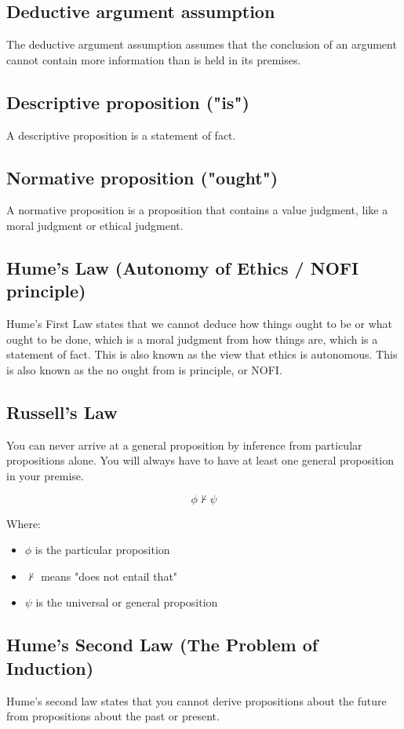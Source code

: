 \documentclass[11pt]{article}
\begin{document}
\subsection{Deductive argument assumption}
\label{sec:org63f4951}
The deductive argument assumption assumes that the conclusion of an argument cannot contain more information than is held in its premises.
\subsection{Descriptive proposition ("is")}
\label{sec:orge9955ba}
A descriptive proposition is a statement of fact.
\subsection{Normative proposition ("ought")}
\label{sec:org2c5ef66}
A normative proposition is a proposition that contains a value judgment, like a moral judgment or ethical judgment.
\subsection{Hume's Law (Autonomy of Ethics / NOFI principle)}
\label{sec:org2967670}
Hume's First Law states that we cannot deduce how things ought to be or what ought to be done, which is a moral judgment from how things are, which is a statement of fact. This is also known as the view that ethics is autonomous. This is also known as the no ought from is principle, or NOFI.
\subsection{Russell's Law}
\label{sec:org8ccf185}
You can never arrive at a general proposition by inference from particular propositions alone. You will always have to have at least one general proposition in your premise.

\[\phi \nvdash \psi\]

Where:
\begin{itemize}
\item \(\phi\) is the particular proposition
\item \(\nvdash\) means "does not entail that"
\item \(\psi\) is the universal or general proposition
\end{itemize}
\subsection{Hume's Second Law (The Problem of Induction)}
\label{sec:org5c250d2}
Hume's second law states that you cannot derive propositions about the future from propositions about the past or present.
\end{document}
